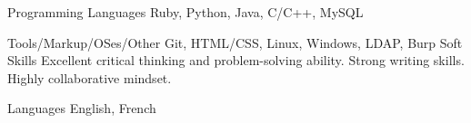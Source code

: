 

\begin{cvskills}

  \cvskill
    {Programming Languages} %
    {Ruby, Python, Java, C/C++, MySQL} %

  \cvskill
    {Tools/Markup/OSes/Other} %
    {Git, HTML/CSS, Linux, Windows, LDAP, Burp} %
  \cvskill
    {Soft Skills} %
    {Excellent critical thinking and problem-solving ability. Strong writing skills. Highly collaborative mindset. } %

  \cvskill
    {Languages} %
    {English, French} %

\end{cvskills}